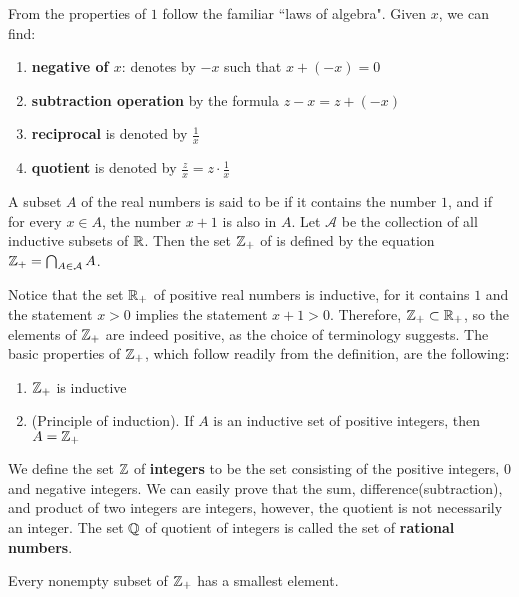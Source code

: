 From the properties of $1$ follow the familiar ``laws of algebra". Given $x$, we can find:
\begin{enumerate}[itemsep=0pt]
    \item \textbf{negative of $x$}: denotes by $-x$ such that $x + (-x) = 0$
    \item \textbf{subtraction operation} by the formula $z - x = z + (-x)$
    \item \textbf{reciprocal} is denoted by $\frac{1}{x}$
    \item \textbf{quotient} is denoted by $\frac{z}{x} = z \cdot \frac{1}{x}$
\end{enumerate}

\begin{definition}
A subset $A$ of the real numbers is said to be \textbf{} if it contains the number $1$, and if for every $x \in A$, the number $x + 1$ is also in $A$. Let $\mathcal{A}$ be the collection of all inductive subsets of $\mathbb{R}$. Then the set $\mathbb{Z}_+$ of \textbf{} is defined by the equation $\mathbb{Z}_+ = \bigcap_{A \in \mathcal{A}} A$.
\end{definition}

Notice that the set $\mathbb{R}_+$ of positive real numbers is inductive, for it contains $1$ and the statement $x > 0$ implies the statement $x + 1 > 0$. Therefore, $\mathbb{Z}_+ \subset \mathbb{R}_+$, so the elements of $\mathbb{Z}_+$ are indeed positive, as the choice of terminology suggests. The basic properties of $\mathbb{Z}_+$, which follow readily from the definition, are the following:
\begin{enumerate}[itemsep=0pt]
    \item $\mathbb{Z}_+$ is inductive
    \item (Principle of induction). If $A$ is an inductive set of positive integers, then $A = \mathbb{Z}_+$
\end{enumerate}

We define the set $\mathbb{Z}$ of \textbf{integers} to be the set consisting of the positive integers, $0$ and negative integers. We can easily prove that the sum, difference(subtraction), and product of two integers are integers, however, the quotient is not necessarily an integer. The set $\mathbb{Q}$ of quotient of integers is called the set of \textbf{rational numbers}.

\begin{theorem}
Every nonempty subset of $\mathbb{Z}_+$ has a smallest element.
\end{theorem}

